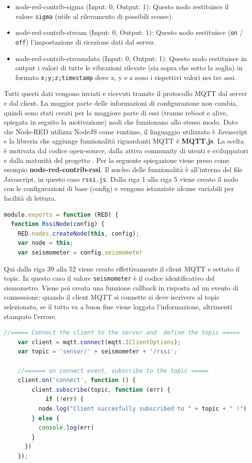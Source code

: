 \documentclass[a4paper,10pt]{memoir}
\begin{document}
\begin{itemize}
    \item node-red-contrib-sigma (Input: 0, Output: 1): Questo nodo restituisce il valore \texttt{sigma} (utile al rilevamento di possibili scosse).
\item node-red-contrib-stream (Input: 0, Output: 1): Questo nodo restituisce (\texttt{on} / \texttt{off}) l'impostazione di ricezione dati dal server.
    \item node-red-contrib-streamdata (Input: 0, Output: 1): Questo nodo restituisce in output i valori di tutte le vibrazioni rilevate (sia sopra che sotto la soglia) in formato \texttt{x;y;z;timestamp} dove x, y e z sono i rispettivi valori nei tre assi.
\end{itemize}

Tutti questi dati vengono inviati e ricevuti tramite il protocollo MQTT dal server e dal client. La maggior parte delle informazioni di configurazione non cambia, quindi sono stati creati per la maggiore parte di essi (tranne reboot e alive, spiegata in seguito la motivazione) nodi che funzionano allo stesso modo.
Dato che Node-RED utilizza NodeJS come runtime, il linguaggio utilizzato è Javascript e la libreria che aggiunge funzionalità riguardanti MQTT è \textbf{MQTT.js}.
La scelta è motivata dal codice open-source, dalla attiva community di utenti e sviluppatori e dalla maturità del progetto \cite{mqttjs}.
Per la seguente spiegazione viene preso come esempio \textbf{node-red-contrib-rssi}.
Il nucleo delle funzionalità è all'interno del file Javascript, in questo caso \texttt{rssi.js}.
Dalla riga 1 alla riga 5 viene creato il nodo con le configurazioni di base (config) e vengono istanziate alcune variabili per facilità di lettura.
\begin{lstlisting}[language=Javascript]
module.exports = function (RED) {
  function RssiNode(config) {
    RED.nodes.createNode(this, config);
    var node = this;
    var seismometer = config.seismometer
\end{lstlisting}
\clearpage
Qui dalla riga 39 alla 52 viene creato effettivamente il client MQTT e settato il topic. In questo caso il valore \texttt{seismometer} è il codice identificativo del sismometro.
Viene poi creata una funzione callback in risposta ad un evento di connessione: quando il client MQTT si connette si deve iscrivere al topic selezionato, se il tutto va a buon fine viene loggata l'informazione, altrimenti stampato l'errore.
\begin{lstlisting}[language=Javascript, firstnumber=39]
    //===== Connect the client to the server and  define the topic =====
    var client = mqtt.connect(mqtt.IClientOptions);
    var topic = 'sensor/' + seismometer + '/rssi';
    
    //====== on connect event, subscribe to the topic =====
    client.on('connect', function () {
        client.subscribe(topic, function (err) {
            if (!err) {
          node.log("Client succesfully subscribed to " + topic + " !");
        } else {
          console.log(err)
        }
      })
    });
\end{lstlisting}
\end{document}
